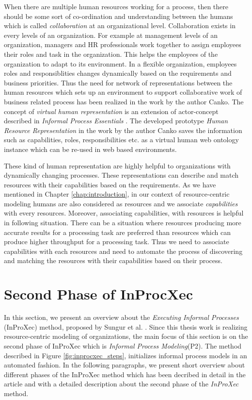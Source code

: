 When there are multiple human resources working for a process, then there should be some sort of co-ordination and understanding between the humans which is called \textit{collaboration} at an organizational level. Collaboration exists in every levels of an organization. For example at management levels of an organization, managers and HR professionals work together to assign employees their roles and task in the organization. This helps the employees of the organization to adapt to its environment. In a flexible organization, employees roles and responsiblities changes dynamically based on the requirements and business priorities. Thus the need for network of representations between the human resources which sets up an environment to support collaborative work of business related process has been realized in the work by the author Canko\cite{Canko2015}. The concept of \textit{virtual human representation} is an extension of  actor-concept described in  \textit{Informal Process Essentials} \cite{Sungur2014a}. The developed prototype \textit{Human Resource Representation} in the work by the author Canko\cite{Canko2015} saves the information such as capabilities, roles, responsibilities etc.  as a virtual human web ontology instance which can be re-used in web based environments.

These kind of human representation are highly helpful to organizations with dynamically changing processes. These representations can describe and match resources with their capabilities based on the requirements. As we have mentioned in Chapter \ref{chap:introduction}, in our context of resource-centric modeling humans are also considered as resources and we associate \textit{capabilities} with every resources. Moreover, associating capabilities, with resources is helpful in following situation. There can be a situation where resources producing more accurate results for a processing task are preferred than resources which can produce higher throughput for a processing task. Thus we need to associate capabilities with each resources and need to automate the process of discovering and matching the resources with their capabilities based on their process. 

\section{Second Phase of InProcXec}
\label{sec:inproxec}
In this section, we present an overview about the \textit{Executing Informal Processes} (InProXec) method, proposed by Sungur et al. \cite{Sungur2015}. Since this thesis work is realizing resource-centric modeling of organizations, the main focus of this section is on the second phase of InProXec which is \textit{Informal Process Modeling}(P2). The method described in Figure \ref{fig:inprocxec_steps}, initializes informal process models in an automated fashion. In the following paragraphs, we present short overview about different phases of the InProXec method which has been decribed in detail in the article \cite{Sungur2015} and with a detailed description about the second phase of the \textit{InProXec} method. 

